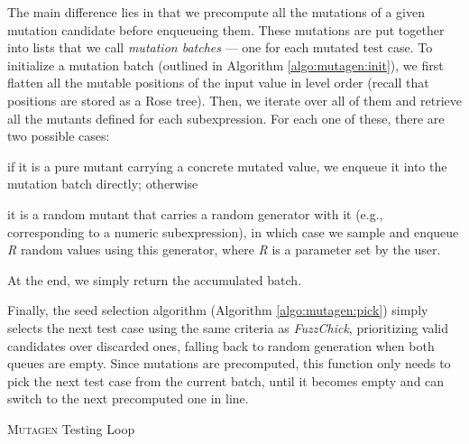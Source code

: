 \documentclass[sigconf, anonymous]{acmart}
\newcommand{\fuzzchick}{\textit{FuzzChick}\xspace}
\newcommand{\mutagen}{\textsc{Mutagen}\xspace}
\begin{document}
The main difference lies in that we precompute all the mutations of a given
mutation candidate before enqueueing them.
%
These mutations are put together into lists that we call \emph{mutation batches}
--- one for each mutated test case.
%
To initialize a mutation batch (outlined in Algorithm \ref{algo:mutagen:init}),
we first flatten all the mutable positions of the input value in level order
(recall that positions are stored as a Rose tree).
%
Then, we iterate over all of them and retrieve all the mutants defined for each
subexpression.
%
For each one of these, there are two possible cases:
%
\begin{inparaenum}
\item if it is a pure mutant carrying a concrete mutated value, we enqueue it
  into the mutation batch directly; otherwise
\item it is a random mutant that carries a random generator with it (e.g.,
  corresponding to a numeric subexpression), in which case we sample and enqueue
  \textit{R} random values using this generator, where \textit{R} is a parameter
  set by the user.
\end{inparaenum}
%
At the end, we simply return the accumulated batch.


Finally, the seed selection algorithm (Algorithm \ref{algo:mutagen:pick}) simply
selects the next test case using the same criteria as \fuzzchick, prioritizing
valid candidates over discarded ones, falling back to random generation when
both queues are empty.
%
Since mutations are precomputed, this function only needs to pick the next test
case from the current batch, until it becomes empty and can switch to the next
precomputed one in line.


\begin{algorithm}
  \SetInd{0em}{0.75em}
  \SetAlgoLined
  \DontPrintSemicolon
\caption{\label{algo:mutagen:loop}\mutagen Testing Loop}
\end{algorithm}
\end{document}
